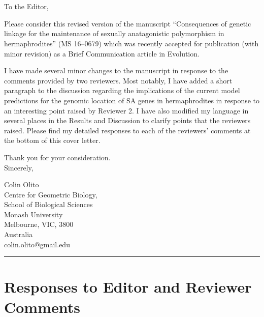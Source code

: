 \documentclass[11pt]{article}
\begin{document}




\section*{}
\noindent To the Editor,
\bigskip

Please consider this revised version of the manuscript “Consequences of genetic linkage for the maintenance of sexually anatagonistic polymorphism in hermaphrodites” (MS 16--0679) which was recently accepted for publication (with minor revision) as a Brief Communication article in Evolution.
\bigskip

I have made several minor changes to the manuscript in response to the comments provided by two reviewers. Most notably, I have added a short paragraph to the discussion regarding the implications of the current model predictions for the genomic location of SA genes in hermaphrodites in response to an interesting point raised by Reviewer 2. I have also modified my language in several places in the Results and Discussion to clarify points that the reviewers raised. Please find my detailed responses to each of the reviewers' comments at the bottom of this cover letter.
\bigskip

\noindent Thank you for your consideration. \\
\noindent Sincerely,
\bigskip

\noindent Colin Olito \\
\noindent Centre for Geometric Biology, \\
\noindent School of Biological Sciences \\
\noindent Monash University \\
\noindent Melbourne, VIC, 3800 \\
\noindent Australia \\
\noindent colin.olito@gmail.edu \\
	
\bigskip
\noindent \rule{\textwidth}{0.4pt}
\bigskip

\newpage{}

\section*{Responses to Editor and Reviewer Comments}
\end{document}
